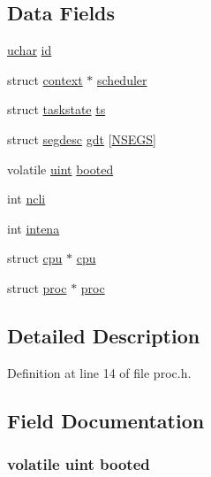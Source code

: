 \subsection*{Data Fields}
\begin{DoxyCompactItemize}
\item 
\hyperlink{types_8h_a65f85814a8290f9797005d3b28e7e5fc}{uchar} \hyperlink{structcpu_a1a656e73d1ea05b0fe2307f8a5eab1b1}{id}
\item 
struct \hyperlink{structcontext}{context} $\ast$ \hyperlink{structcpu_a98d6c9467c7b12be6c9c95a7f2cd76ee}{scheduler}
\item 
struct \hyperlink{structtaskstate}{taskstate} \hyperlink{structcpu_a20aef12941acee6e8f1a0693b1fbf681}{ts}
\item 
struct \hyperlink{structsegdesc}{segdesc} \hyperlink{structcpu_ad9d6d1fdf72705e51d5024df0f2e69a5}{gdt} \mbox{[}\hyperlink{proc_8h_a2fca412c6ed6584438e96f43ccce030a}{N\-S\-E\-G\-S}\mbox{]}
\item 
volatile \hyperlink{types_8h_a91ad9478d81a7aaf2593e8d9c3d06a14}{uint} \hyperlink{structcpu_abf27dd9e6a92da384cbfd35ec3325919}{booted}
\item 
int \hyperlink{structcpu_a47f2115921397412b52d8aa2680510ec}{ncli}
\item 
int \hyperlink{structcpu_ad4abc2486db103b06edb4f8870d1cda8}{intena}
\item 
struct \hyperlink{structcpu}{cpu} $\ast$ \hyperlink{structcpu_a01255252d6a6f1a4d5550f72dfe3a733}{cpu}
\item 
struct \hyperlink{structproc}{proc} $\ast$ \hyperlink{structcpu_a333f53825c4bbc35baa89f385e8bafc8}{proc}
\end{DoxyCompactItemize}


\subsection{Detailed Description}


Definition at line 14 of file proc.\-h.



\subsection{Field Documentation}
\hypertarget{structcpu_abf27dd9e6a92da384cbfd35ec3325919}{
\subsubsection[{booted}]{\setlength{\rightskip}{0pt plus 5cm}volatile {\bf uint} booted}}\label{structcpu_abf27dd9e6a92da384cbfd35ec3325919}


